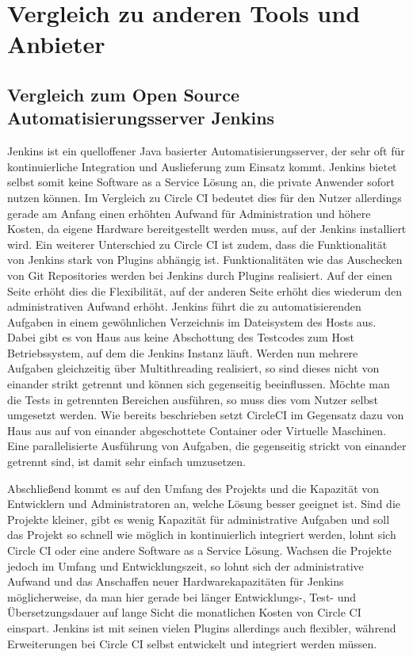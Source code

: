 \documentclass[11pt]{article}
\begin{document}
\section {Vergleich zu anderen Tools und Anbieter}
\subsection {Vergleich zum Open Source Automatisierungsserver Jenkins}
Jenkins ist ein quelloffener Java basierter Automatisierungsserver, der sehr oft für kontinuierliche Integration und Auslieferung zum Einsatz kommt. Jenkins bietet selbst somit keine Software as a Service Lösung an, die private Anwender sofort nutzen können. Im Vergleich zu Circle CI bedeutet dies für den Nutzer allerdings gerade am Anfang einen erhöhten Aufwand für Administration und höhere Kosten, da eigene  Hardware bereitgestellt werden muss, auf der Jenkins installiert wird. Ein weiterer Unterschied zu Circle CI ist zudem, dass die Funktionalität von Jenkins stark von Plugins abhängig ist. Funktionalitäten wie das Auschecken von Git Repositories werden bei Jenkins durch Plugins realisiert. Auf der einen Seite erhöht dies die Flexibilität, auf der anderen Seite erhöht dies wiederum den administrativen Aufwand erhöht. Jenkins führt die zu automatisierenden Aufgaben in einem gewöhnlichen Verzeichnis im Dateisystem des Hosts aus. Dabei gibt es von Haus aus keine Abschottung des Testcodes zum Host Betriebssystem, auf dem die Jenkins Instanz läuft. Werden nun mehrere Aufgaben gleichzeitig über Multithreading realisiert, so sind dieses nicht von einander strikt getrennt und können sich gegenseitig beeinflussen. Möchte man die Tests in getrennten Bereichen ausführen, so muss dies vom Nutzer selbst umgesetzt werden. Wie bereits beschrieben setzt CircleCI im Gegensatz dazu von Haus aus auf von einander abgeschottete Container oder Virtuelle Maschinen. Eine parallelisierte Ausführung von Aufgaben, die gegenseitig strickt von einander getrennt sind, ist damit sehr einfach umzusetzen.

Abschließend kommt es auf den Umfang des Projekts und die Kapazität von Entwicklern und Administratoren an, welche Lösung besser geeignet ist. Sind die Projekte kleiner, gibt es wenig Kapazität für administrative Aufgaben und soll das Projekt so schnell wie möglich in kontinuierlich integriert werden, lohnt sich Circle CI oder eine andere Software as a Service Lösung. Wachsen die Projekte jedoch im Umfang und Entwicklungszeit, so lohnt sich der administrative Aufwand und das Anschaffen neuer Hardwarekapazitäten für Jenkins möglicherweise, da man hier gerade bei länger Entwicklungs-, Test- und Übersetzungsdauer auf lange Sicht die monatlichen Kosten von Circle CI einspart. Jenkins ist mit seinen vielen Plugins allerdings auch flexibler, während Erweiterungen bei Circle CI selbst entwickelt und integriert werden müssen.
\end{document}
